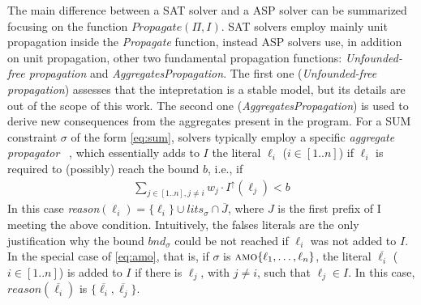 The main difference between a SAT solver and a ASP solver can be summarized focusing on 
the function $\mathit{Propagate}(\Pi,I)$.
SAT solvers employ mainly unit propagation inside the \textit{Propagate} function,
instead ASP solvers use, in addition on unit propagation, other two fundamental  
propagation functions: \textit{Unfounded-free propagation} and \textit{AggregatesPropagation}.
The first one (\textit{Unfounded-free propagation}) assesses that the intepretation is a stable model, but its details
are out of the scope of this work.
The second one (\textit{AggregatesPropagation}) is used to derive new consequences from 
the aggregates present in the program. 
For a SUM constraint $\sigma$ of the form \eqref{eq:sum},
solvers typically employ a 
specific \textit{aggregate propagator}
~\cite{DBLP:conf/iclp/GebserKKS09,DBLP:journals/fuin/FaberLMR11},
which essentially adds to $I$ the literal $\ell_i$ ($i \in [1..n]$) if $\ell_i$ is required to (possibly) reach the bound $b$, i.e., if
\begin{align}\label{eq:sum:propagation}
    \sum_{j \in [1..n], j \neq i}{w_j \cdot I^\uparrow(\ell_j)} < b
\end{align}
In this case \textit{reason}$(\ell_i) = \{\ell_i\} \cup lits_{\sigma} \cap \overline{J}$,
where $J$ is the first prefix of I meeting the above condition.
Intuitively, the falses literals are the only justification why the bound $\mathit{bnd}_{\sigma}$
could be not reached if $\ell_i$ was not added to $I$.
In the special case of \eqref{eq:amo}, that is, if $\sigma$ is $\textsc{amo}\{\ell_1, \ldots, \ell_n\}$, the literal $\overline{\ell_i}$ ($i \in [1..n]$) is added to $I$ if there is $\ell_j$, with $j \neq i$, such that $\ell_j \in I$.
In this case, $\mathit{reason}(\overline{\ell_i})$ is $\{\overline{\ell_i}, \overline{\ell_j}\}$.


